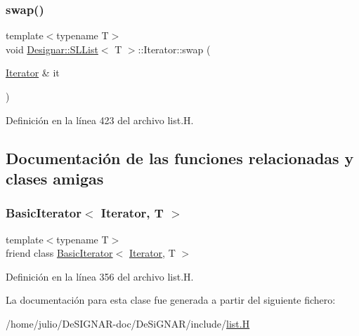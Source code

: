 \mbox{\label{class_designar_1_1_s_l_list_1_1_iterator_afbb40762fe2a3c8ecea8fb26751492e0}} 
\subsubsection{\texorpdfstring{swap()}{swap()}}
{\footnotesize\ttfamily template$<$typename T$>$ \\
void \hyperlink{class_designar_1_1_s_l_list}{Designar\+::\+S\+L\+List}$<$ T $>$\+::Iterator\+::swap (\begin{DoxyParamCaption}\item[{\hyperlink{class_designar_1_1_s_l_list_1_1_iterator}{Iterator} \&}]{it }\end{DoxyParamCaption})\hspace{0.3cm}{\ttfamily [inline]}}



Definición en la línea 423 del archivo list.\+H.



\subsection{Documentación de las funciones relacionadas y clases amigas}
\mbox{\label{class_designar_1_1_s_l_list_1_1_iterator_ae3421d6be56b523bf3c41ceb29f3e5d7}} 
\subsubsection{\texorpdfstring{Basic\+Iterator$<$ Iterator, T $>$}{BasicIterator< Iterator, T >}}
{\footnotesize\ttfamily template$<$typename T$>$ \\
friend class \hyperlink{class_designar_1_1_basic_iterator}{Basic\+Iterator}$<$ \hyperlink{class_designar_1_1_s_l_list_1_1_iterator}{Iterator}, T $>$\hspace{0.3cm}{\ttfamily [friend]}}



Definición en la línea 356 del archivo list.\+H.



La documentación para esta clase fue generada a partir del siguiente fichero\+:\begin{DoxyCompactItemize}
\item 
/home/julio/\+De\+S\+I\+G\+N\+A\+R-\/doc/\+De\+Si\+G\+N\+A\+R/include/\hyperlink{list_8_h}{list.\+H}\end{DoxyCompactItemize}
